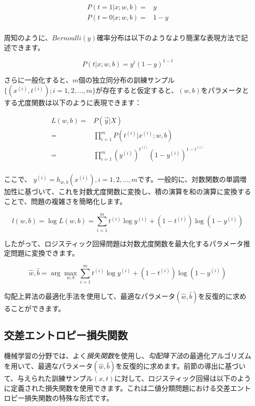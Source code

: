 \begin{content}
\[\begin{aligned}
  P(t = 1|x;w,b) = & y \\ 
  P(t = 0|x;w,b) = & 1 - y \\ 
\end{aligned} \]

周知のように、$Bernoulli(y)$確率分布は以下のようなより簡潔な表現方法で記述できます。

\[P(t|x;w,b) = {y^t}{(1 - y)^{1 - t}}\]

さらに一般化すると、$m$個の独立同分布の訓練サンプル$\{ ({x^{(i)}},{t^{(i)}});i = 1,2,...,m\}$が存在すると仮定すると、$(w,b)$をパラメータとする尤度関数は以下のように表現できます：

\[\begin{aligned}
  L(w,b) =  & P\left( {\vec y|X} \right) \\ 
   =  & \prod\limits_{i = 1}^m {P\left( {{t^{(i)}}|{x^{(i)}};w,b} \right)}  \\ 
   =  & \prod\limits_{i = 1}^m {{{\left( {{y^{(i)}}} \right)}^{{t^{(i)}}}}{{\left( {1 - {y^{(i)}}} \right)}^{1 - {t^{(i)}}}}}  \\ 
\end{aligned} \]

ここで、
${y^{(i)}} = {h_{w,b}}({x^{(i)}}), i=1,2,...,m $です。一般的に、対数関数の単調増加性に基づいて、これを対数尤度関数に変換し、積の演算を和の演算に変換することで、問題の複雑さを簡略化します。

\[l(w,b) = \log L(w,b) = \sum\limits_{i = 1}^m {{t^{(i)}}\log {y^{(i)}} + \left( {1 - {t^{(i)}}} \right)\log \left( {1 - {y^{(i)}}} \right)} \]

したがって、ロジスティック回帰問題は対数尤度関数を最大化するパラメータ推定問題に変換できます。

\[\hat w,\hat b = \arg \mathop {\max }\limits_{w,b} \sum\limits_{i = 1}^m {{t^{(i)}}\log {y^{(i)}} + \left( {1 - {t^{(i)}}} \right)\log \left( {1 - {y^{(i)}}} \right)} \]

勾配上昇法の最適化手法を使用して、最適なパラメータ$(\hat w,\hat b)$を反復的に求めることができます。

\subsection{交差エントロピー損失関数}

機械学習の分野では、よく\emph{損失関数}を使用し、\emph{勾配降下法}の最適化アルゴリズムを用いて、最適なパラメータ$(\hat w,\hat b)$を反復的に求めます。前節の導出に基づいて、与えられた訓練サンプル$(x, t)$に対して、ロジスティック回帰は以下のように定義された損失関数を使用できます。これは二値分類問題における交差エントロピー損失関数の特殊な形式です。


\end{content}
